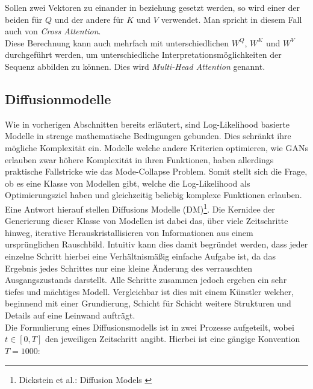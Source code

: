 Sollen zwei Vektoren zu einander in beziehung gesetzt werden, so wird einer der beiden für $Q$ und der andere für $K$ und $V$ verwendet. Man spricht in diesem Fall auch von \textit{Cross Attention}. \\
Diese Berechnung kann auch mehrfach mit unterschiedlichen $W^Q$, $W^K$ und $W^V$ durchgeführt werden, um unterschiedliche Interpretationsmöglichkeiten der Sequenz abbilden zu können. Dies wird \textit{Multi-Head Attention} genannt.

\subsection{Diffusionmodelle}
\label{subsec:Grundlagen_DMs}

Wie in vorherigen Abschnitten bereits erläutert, sind Log-Likelihood basierte Modelle in strenge mathematische Bedingungen gebunden. Dies schränkt ihre mögliche Komplexität ein. Modelle welche andere Kriterien optimieren, wie GANs erlauben zwar höhere Komplexität in ihren Funktionen, haben allerdings praktische Fallstricke wie das Mode-Collapse Problem. Somit stellt sich die Frage, ob es eine Klasse von Modellen gibt, welche die Log-Likelihood als Optimierungsziel haben und gleichzeitig beliebig komplexe Funktionen erlauben. \\
Eine Antwort hierauf stellen Diffusions Modelle (DM)\footnote{
    Dickstein et al.: Diffusion Models
    \cite{pmlr-v37-sohl-dickstein15}
}. Die Kernidee der Generierung dieser Klasse von Modellen ist dabei das, über viele Zeitschritte hinweg, iterative Herauskristallisieren von Informationen aus einem ursprünglichen Rauschbild. Intuitiv kann dies damit begründet werden, dass jeder einzelne Schritt hierbei eine Verhältnismäßig einfache Aufgabe ist, da das Ergebnis jedes Schrittes nur eine kleine Änderung des verrauschten Ausgangszustands darstellt. Alle Schritte zusammen jedoch ergeben ein sehr tiefes und mächtiges Modell. Vergleichbar ist dies mit einem Künstler welcher, beginnend mit einer Grundierung, Schicht für Schicht weitere Strukturen und Details auf eine Leinwand aufträgt. \\
Die Formulierung eines Diffusionsmodells ist in zwei Prozesse aufgeteilt, wobei $t \in [0,T]$ den jeweiligen Zeitschritt angibt. Hierbei ist eine gängige Konvention $T=1000$: 
